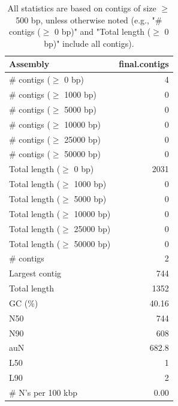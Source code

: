 \documentclass[12pt,a4paper]{article}
\begin{document}
\begin{table}[ht]
\begin{center}
\caption{All statistics are based on contigs of size $\geq$ 500 bp, unless otherwise noted (e.g., "\# contigs ($\geq$ 0 bp)" and "Total length ($\geq$ 0 bp)" include all contigs).}
\begin{tabular}{|l*{1}{|r}|}
\hline
Assembly & final.contigs \\ \hline
\# contigs ($\geq$ 0 bp) & 4 \\ \hline
\# contigs ($\geq$ 1000 bp) & 0 \\ \hline
\# contigs ($\geq$ 5000 bp) & 0 \\ \hline
\# contigs ($\geq$ 10000 bp) & 0 \\ \hline
\# contigs ($\geq$ 25000 bp) & 0 \\ \hline
\# contigs ($\geq$ 50000 bp) & 0 \\ \hline
Total length ($\geq$ 0 bp) & 2031 \\ \hline
Total length ($\geq$ 1000 bp) & 0 \\ \hline
Total length ($\geq$ 5000 bp) & 0 \\ \hline
Total length ($\geq$ 10000 bp) & 0 \\ \hline
Total length ($\geq$ 25000 bp) & 0 \\ \hline
Total length ($\geq$ 50000 bp) & 0 \\ \hline
\# contigs & 2 \\ \hline
Largest contig & 744 \\ \hline
Total length & 1352 \\ \hline
GC (\%) & 40.16 \\ \hline
N50 & 744 \\ \hline
N90 & 608 \\ \hline
auN & 682.8 \\ \hline
L50 & 1 \\ \hline
L90 & 2 \\ \hline
\# N's per 100 kbp & 0.00 \\ \hline
\end{tabular}
\end{center}
\end{table}
\end{document}
